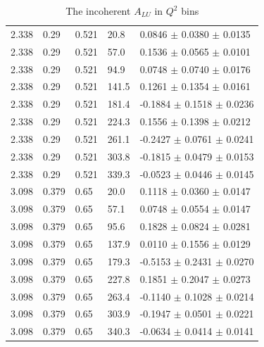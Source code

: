 \begin{table}[!h]
\begin{center}
\begin{tabular}{||l|l|l|l|l||}
  \hline                                                                        
   2.338 & 0.29 & 0.521   & 20.8  &  0.0846   $\pm$  0.0380   $\pm$   0.0135  \\
   2.338 & 0.29 & 0.521   & 57.0  &  0.1536   $\pm$  0.0565   $\pm$   0.0101  \\
   2.338 & 0.29 & 0.521   & 94.9  &  0.0748   $\pm$  0.0740   $\pm$   0.0176  \\
   2.338 & 0.29 & 0.521   & 141.5 &  0.1261   $\pm$  0.1354   $\pm$   0.0161  \\
   2.338 & 0.29 & 0.521   & 181.4 & -0.1884   $\pm$  0.1518   $\pm$   0.0236  \\
   2.338 & 0.29 & 0.521   & 224.3 &  0.1556   $\pm$  0.1398   $\pm$   0.0212  \\
   2.338 & 0.29 & 0.521   & 261.1 & -0.2427   $\pm$  0.0761   $\pm$   0.0241  \\
   2.338 & 0.29 & 0.521   & 303.8 & -0.1815   $\pm$  0.0479   $\pm$   0.0153  \\
   2.338 & 0.29 & 0.521   & 339.3 & -0.0523   $\pm$  0.0446   $\pm$   0.0145  \\
  \hline                                                                        
   3.098 &0.379 & 0.65    & 20.0  &  0.1118   $\pm$  0.0360   $\pm$   0.0147  \\
   3.098 &0.379 & 0.65    & 57.1  &  0.0748   $\pm$  0.0554   $\pm$   0.0147  \\
   3.098 &0.379 & 0.65    & 95.6  &  0.1828   $\pm$  0.0824   $\pm$   0.0281  \\
   3.098 &0.379 & 0.65    & 137.9 &  0.0110   $\pm$  0.1556   $\pm$   0.0129  \\
   3.098 &0.379 & 0.65    & 179.3 & -0.5153   $\pm$  0.2431   $\pm$   0.0270  \\
   3.098 &0.379 & 0.65    & 227.8 &  0.1851   $\pm$  0.2047   $\pm$   0.0273  \\
   3.098 &0.379 & 0.65    & 263.4 & -0.1140   $\pm$  0.1028   $\pm$   0.0214  \\
   3.098 &0.379 & 0.65    & 303.9 & -0.1947   $\pm$  0.0501   $\pm$   0.0221  \\
   3.098 &0.379 & 0.65    & 340.3 & -0.0634   $\pm$  0.0414   $\pm$   0.0141  \\

 \hline
 \hline
      \end{tabular}
      \caption{The incoherent $A_{LU}$ in $Q^2$ bins}
      \label{table:InCoh_Q2_BSA}
   \end{center}
\end{table}


